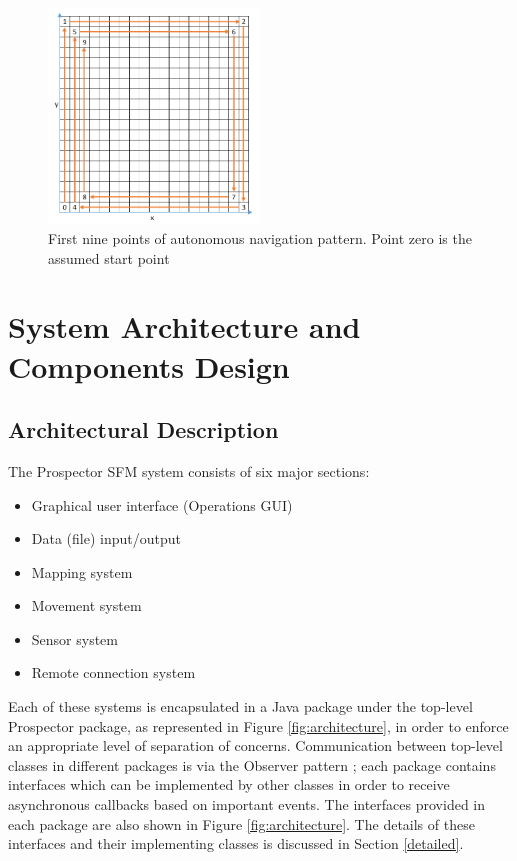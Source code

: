 \documentclass[12pt]{article}
\begin{document}
\begin{figure}[!htb]
\centering\includegraphics[width=0.5\textwidth]{grid2.png}
\caption{First nine points of autonomous navigation pattern. Point zero is the assumed start point}
  \label{fig:spiral}
\end{figure}

\FloatBarrier
\section{System Architecture and Components Design}

\subsection{Architectural Description}\label{architecture}
The Prospector SFM system consists of six major sections: 
\begin{itemize}
\item Graphical user interface (Operations GUI)
\item Data (file) input/output
\item Mapping system
\item Movement system
\item Sensor system
\item Remote connection system
\end{itemize}
Each of these systems is encapsulated in a Java package under the top-level Prospector package, as represented in Figure \ref{fig:architecture}, in order to enforce an appropriate level of separation of concerns. Communication between top-level classes in different packages is via the Observer pattern \cite{buschmann}; each package contains interfaces which can be implemented by other classes in order to receive asynchronous callbacks based on important events. The interfaces provided in each package are also shown in Figure \ref{fig:architecture}. The details of these interfaces and their implementing classes is discussed in Section \ref{detailed}.
\end{document}
